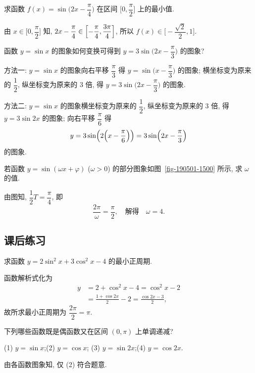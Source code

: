 \begin{exercise}
    求函数 $f(x)=\sin\Big(2x-\dfrac\pi4\Big)$ 在区间 $\Big[0,\dfrac\pi2\Big]$ 上的最小值.
\end{exercise}
\beginsolution
    由 $x\in\Big[0,\dfrac\pi2\Big]$ 知, $2x-\dfrac\pi4\in \Bigl[-\dfrac\pi4, \dfrac{3\pi}4\Bigr]$, 所以 $f(x)\in \biggl[-\dfrac{\sqrt2}2, 1\biggr]$.
\endsolution

\begin{exercise}
    函数 $y=\sin x$ 的图象如何变换可得到 $y=3\sin\Big(2x-\dfrac\pi3\Big)$ 的图象?
\end{exercise}
\beginsolution
    方法一: $y=\sin x$ 的图象向右平移 $\dfrac\pi3$ 得 $y= \sin\biggl(x- \dfrac\pi3\biggr)$ 的图象; 横坐标变为原来的 $\dfrac12$, 纵坐标变为原来的 $3$ 倍, 得 $y=3\sin\Big(2x-\dfrac\pi3\Big)$ 的图象.

    方法二: $y=\sin x$ 的图象横坐标变为原来的 $\dfrac12$, 纵坐标变为原来的 $3$ 倍, 得 $y=3\sin2x$ 的图象; 向右平移 $\dfrac\pi6$ 得 
    \[y= 3\sin\Bigl(2\Bigl(x- \dfrac\pi6\Bigr)\Bigr)
        = 3\sin\Bigl(2x-\dfrac\pi3\Bigr)\]
    的图象.
\endsolution

\begin{exercise}
    若函数 $y=\sin(\omega x+\varphi)$ ($\omega>0$) 
    的部分图象如图~\ref{fig-190501-1500} 所示, 求 $\omega$ 的值.
\end{exercise}
\beginsolution
    由图知, $\dfrac12 T= \dfrac\pi4$, 即
    \[\frac{2\pi}{\omega}= \frac\pi2,\quad\text{解得}\quad
        \omega= 4.\]
\endsolution
    
\subsection{课后练习}
\begin{exercise}
    求函数 $y=2\sin^2 x+3\cos^2 x-4$ 的最小正周期.
\end{exercise}
\beginsolution
    函数解析式化为
    \[\begin{aligned}
        y&= 2+\cos^2 x-4= \cos^2 x-2\\
        &= \frac{1+\cos2x}{2}- 2= \frac{\cos2x-3}{2},
    \end{aligned}\]
    故所求最小正周期为 $\dfrac{2\pi}2= \pi$.
\endsolution

\begin{exercise}
    下列哪些函数既是偶函数又在区间 $(0,\pi)$ 上单调递减?
    
    (1) $y=\sin x$;\quad (2) $y=\cos x$;\quad
    (3) $y=\sin2x$;\quad (4) $y=\cos2x$.
\end{exercise}
\beginsolution
    由各函数图象知, 仅 (2) 符合题意.
\endsolution

